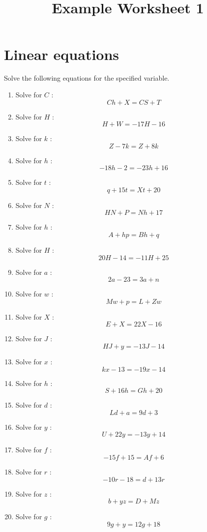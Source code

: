 \documentclass{article}
\begin{document}
    \title{Example Worksheet 1} 
 \date{\vspace{-5ex}} 
 \maketitle

        \section{Linear equations}
        Solve the following equations for the specified variable.
        \begin{multicols}{1}
        \begin{enumerate}
        \item Solve for $C$ : $$C h + X = C S + T$$
\item Solve for $H$ : $$H + W = - 17 H - 16$$
\item Solve for $k$ : $$Z - 7 k = Z + 8 k$$
\item Solve for $h$ : $$- 18 h - 2 = - 23 h + 16$$
\item Solve for $t$ : $$q + 15 t = X t + 20$$
\item Solve for $N$ : $$H N + P = N h + 17$$
\item Solve for $h$ : $$A + h p = B h + q$$
\item Solve for $H$ : $$20 H - 14 = - 11 H + 25$$
\item Solve for $a$ : $$2 a - 23 = 3 a + n$$
\item Solve for $w$ : $$M w + p = L + Z w$$
\item Solve for $X$ : $$E + X = 22 X - 16$$
\item Solve for $J$ : $$H J + y = - 13 J - 14$$
\item Solve for $x$ : $$k x - 13 = - 19 x - 14$$
\item Solve for $h$ : $$S + 16 h = G h + 20$$
\item Solve for $d$ : $$L d + a = 9 d + 3$$
\item Solve for $y$ : $$U + 22 y = - 13 y + 14$$
\item Solve for $f$ : $$- 15 f + 15 = A f + 6$$
\item Solve for $r$ : $$- 10 r - 18 = d + 13 r$$
\item Solve for $z$ : $$b + y z = D + M z$$
\item Solve for $g$ : $$9 g + y = 12 g + 18$$
        \end{enumerate}
        \end{multicols}
        
\end{document}
